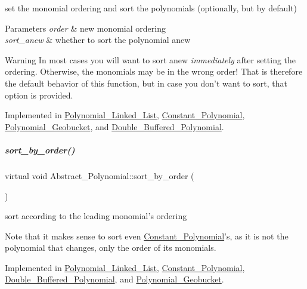 set the monomial ordering and sort the polynomials (optionally, but by default) 


\begin{DoxyParams}{Parameters}
{\em order} & new monomial ordering \\
\hline
{\em sort\+\_\+anew} & whether to sort the polynomial anew \\
\hline
\end{DoxyParams}
\begin{DoxyWarning}{Warning}
In most cases you will want to sort anew {\itshape immediately} after setting the ordering. Otherwise, the monomials may be in the wrong order! That is therefore the default behavior of this function, but in case you don't want to sort, that option is provided. 
\end{DoxyWarning}


Implemented in \hyperlink{group__polygroup_af9b1dee3a8ca9fb26a6e069ea70ea5df}{Polynomial\+\_\+\+Linked\+\_\+\+List}, \hyperlink{group__polygroup_a539835f92490fbbb5ba3b37e4f80ef49}{Constant\+\_\+\+Polynomial}, \hyperlink{group__polygroup_ad3298b3201f53d0ddaa657206c140ca8}{Polynomial\+\_\+\+Geobucket}, and \hyperlink{group__polygroup_aa81be797dcced4e663d3fe54f6501ed6}{Double\+\_\+\+Buffered\+\_\+\+Polynomial}.

\mbox{\label{group__polygroup_a1fcdd29c324c660ea935197c39e682f2}} 
\subparagraph{\texorpdfstring{sort\+\_\+by\+\_\+order()}{sort\_by\_order()}}
{\footnotesize\ttfamily virtual void Abstract\+\_\+\+Polynomial\+::sort\+\_\+by\+\_\+order (\begin{DoxyParamCaption}{ }\end{DoxyParamCaption})\hspace{0.3cm}{\ttfamily [pure virtual]}}



sort according to the leading monomial's ordering 

Note that it makes sense to sort even \hyperlink{group__polygroup_class_constant___polynomial}{Constant\+\_\+\+Polynomial}'s, as it is not the polynomial that changes, only the order of its monomials. 

Implemented in \hyperlink{group__polygroup_a254bec60707b34bd26ef9d9bb08a4fe9}{Polynomial\+\_\+\+Linked\+\_\+\+List}, \hyperlink{group__polygroup_a808018b52eca472a7a1b2995e403f35a}{Constant\+\_\+\+Polynomial}, \hyperlink{group__polygroup_a41e751eee1614e26ebba39a9f81f7993}{Double\+\_\+\+Buffered\+\_\+\+Polynomial}, and \hyperlink{group__polygroup_ad3c705cb5c03be2ed62fea65101d1195}{Polynomial\+\_\+\+Geobucket}.

